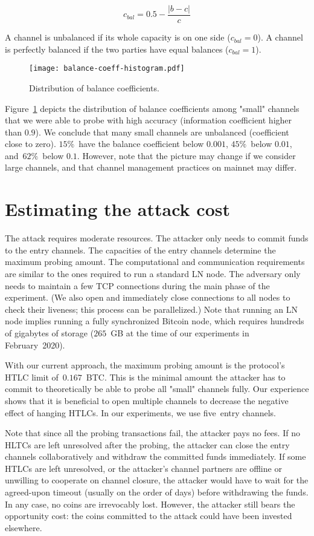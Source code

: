 \[c_{bal} = 0.5 - \frac{|b-c|}{c} \]

A channel is unbalanced if its whole capacity is on one side ($c_{bal} = 0$).
A channel is perfectly balanced if the two parties have equal balances ($c_{bal} = 1$).

\begin{figure}[h]
	\centering
	\texttt{[image: balance-coeff-histogram.pdf]}
	\caption{Distribution of balance coefficients.}
	\label{fig:balance-coeff-histogram}
\end{figure}

Figure~\ref{fig:balance-coeff-histogram} depicts the distribution of balance coefficients among "small" channels that we were able to probe with high accuracy (information coefficient higher than $0.9$).
We conclude that many small channels are unbalanced (coefficient close to zero).
$15\%$~have the balance coefficient below $0.001$, $45\%$~below $0.01$, and~$62\%$~below $0.1$.
However, note that the picture may change if we consider large channels, and that channel management practices on mainnet may differ.


\section{Estimating the attack cost}

The attack requires moderate resources.
The attacker only needs to commit funds to the entry channels.
The capacities of the entry channels determine the maximum probing amount.
The computational and communication requirements are similar to the ones required to run a standard LN node.
The adversary only needs to maintain a few TCP connections during the main phase of the experiment.
(We also open and immediately close connections to all nodes to check their liveness; this process can be parallelized.)
Note that running an LN node implies running a fully synchronized Bitcoin node, which requires hundreds of gigabytes of storage ($265$~GB at the time of our experiments in February~2020).

With our current approach, the maximum probing amount is the protocol's HTLC limit of~$0.167$~BTC\@.
This is the minimal amount the attacker has to commit to theoretically be able to probe all "small" channels fully.
Our experience shows that it is beneficial to open multiple channels to decrease the negative effect of hanging HTLCs.
In our experiments, we use five~entry channels.

Note that since all the probing transactions fail, the attacker pays no fees.
If no HLTCs are left unresolved after the probing, the attacker can close the entry channels collaboratively and withdraw the committed funds immediately.
If some HTLCs are left unresolved, or the attacker's channel partners are offline or unwilling to cooperate on channel closure, the attacker would have to wait for the agreed-upon timeout (usually on the order of days) before withdrawing the funds.
In any case, no coins are irrevocably lost.
However, the attacker still bears the opportunity cost: the coins committed to the attack could have been invested elsewhere.

